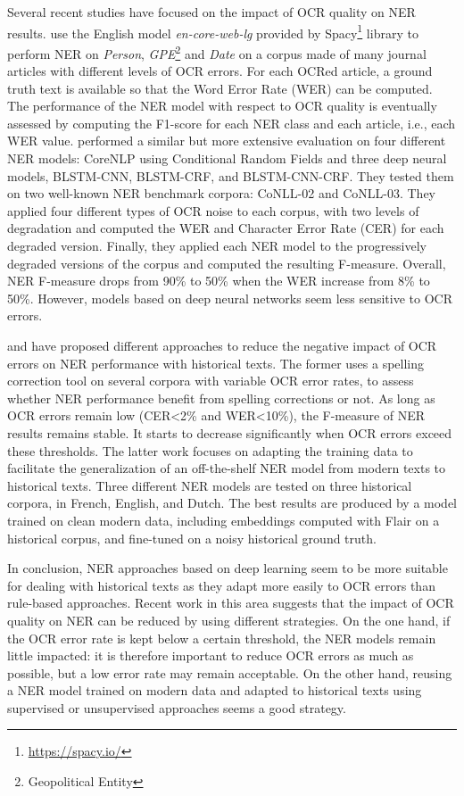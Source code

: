 Several recent studies have focused on the impact of OCR quality on NER results.
\cite{van2020assessing} use the English model \textit{en-core-web-lg} provided by Spacy\footnote{\url{https://spacy.io/}} library to perform NER on \textit{Person}, \textit{GPE}\footnote{Geopolitical Entity} and \textit{Date} on a corpus made of many journal articles with different levels of OCR errors.
For each OCRed article, a ground truth text is available so that the Word Error Rate (WER) can be computed.
The performance of the NER model with respect to OCR quality is eventually assessed by computing the F1-score for each NER class and each article, i.e., each WER value.
\cite{hamdi2020assessing} performed a similar but more extensive evaluation on four different NER models: CoreNLP using Conditional Random Fields and three deep neural models, BLSTM-CNN, BLSTM-CRF, and BLSTM-CNN-CRF.
They tested them on two well-known NER benchmark corpora: CoNLL-02 and CoNLL-03. They applied four different types of OCR noise to each corpus, with two levels of degradation and computed the WER and Character Error Rate (CER) for each degraded version.
Finally, they applied each NER model to the progressively degraded versions of the corpus and computed the resulting F-measure.
Overall, NER F-measure drops from 90\% to 50\% when the WER increase from 8\% to 50\%. However, models based on deep neural networks seem less sensitive to OCR errors.

\cite{huynh2020use} and \cite{marz2021data} have proposed different approaches to reduce the negative impact of OCR errors on NER performance with historical texts.
The former uses a spelling correction tool on several corpora with variable OCR error rates, to assess whether NER performance benefit from spelling corrections or not.
As long as OCR errors remain low (CER<2\% and WER<10\%), the F-measure of NER results remains stable.
It starts to decrease significantly when OCR errors exceed these thresholds.
The latter work focuses on adapting the training data to facilitate the generalization of an off-the-shelf NER model from modern texts to historical texts.
Three different NER models are tested on three historical corpora, in French, English, and Dutch. The best results are produced by a model trained on clean modern data, including embeddings computed with Flair on a historical corpus, and fine-tuned on a noisy historical ground truth.

In conclusion, NER approaches based on deep learning seem to be more suitable for dealing with historical texts as they adapt more easily to OCR errors than rule-based approaches.
Recent work in this area suggests that the impact of OCR quality on NER can be reduced by using different strategies.
On the one hand, if the OCR error rate is kept below a certain threshold, the NER models remain little impacted: it is therefore important to reduce OCR errors as much as possible, but a low error rate may remain acceptable.
On the other hand, reusing a NER model trained on modern data and adapted to historical texts using supervised or unsupervised approaches seems a good strategy. 




